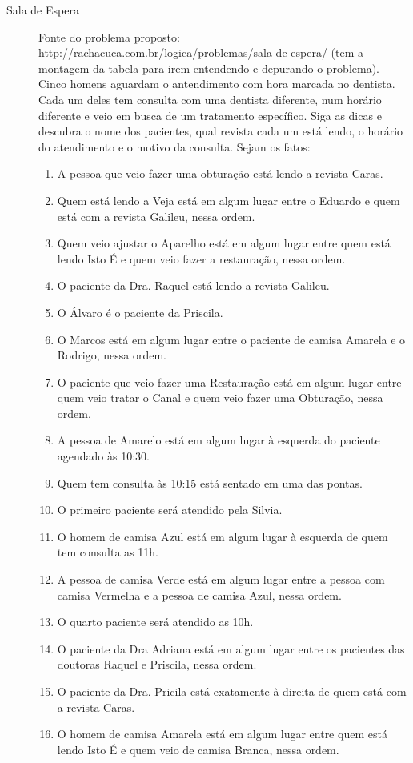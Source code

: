 \documentclass[a4paper,11pt]{article}
\begin{document}
\begin{description}
\begin{enumerate}
  
\end{enumerate}




  \item[Sala de Espera] Fonte do problema proposto:
  \url{http://rachacuca.com.br/logica/problemas/sala-de-espera/} (tem a montagem da tabela para irem entendendo e depurando o problema).\\
  Cinco homens aguardam o antendimento com hora marcada no dentista. Cada um deles tem consulta com uma dentista diferente, num horário diferente e veio em busca de um tratamento específico.
Siga as dicas e descubra o nome dos pacientes, qual revista cada um está lendo, o horário do atendimento e o motivo da consulta. 
Sejam os fatos:
  
  \begin{enumerate}
  \item A pessoa que veio fazer uma obturação está lendo a revista Caras.
  \item  Quem está lendo a Veja está em algum lugar entre o Eduardo e quem está com a revista Galileu, nessa ordem.
  \item  Quem veio ajustar o Aparelho está em algum lugar entre quem está lendo Isto É e quem veio fazer a restauração, nessa ordem.
  \item  O paciente da Dra. Raquel está lendo a revista Galileu.
  \item  O Álvaro é o paciente da Priscila.
  \item  O Marcos está em algum lugar entre o paciente de camisa Amarela e o Rodrigo, nessa ordem.
  \item  O paciente que veio fazer uma Restauração está em algum lugar entre quem veio tratar o Canal e quem veio fazer uma Obturação, nessa ordem.
  \item A pessoa de Amarelo está em algum lugar à esquerda do paciente agendado às 10:30.

    \item Quem tem consulta às 10:15 está sentado em uma das pontas.
    \item     O primeiro paciente será atendido pela Silvia.
    \item     O homem de camisa Azul está em algum lugar à esquerda de quem tem consulta as 11h.
    \item     A pessoa de camisa Verde está em algum lugar entre a pessoa com camisa Vermelha e a pessoa de camisa Azul, nessa ordem.
    \item     O quarto paciente será atendido as 10h.
        \item  O paciente da Dra Adriana está em algum lugar entre os pacientes das doutoras Raquel e Priscila, nessa ordem.
    \item     O paciente da Dra. Pricila está exatamente à direita de quem está com a revista Caras.
    \item     O homem de camisa Amarela está em algum lugar entre quem está lendo Isto É e quem veio de camisa Branca, nessa ordem.


\end{enumerate}
\end{description}
\end{document}
